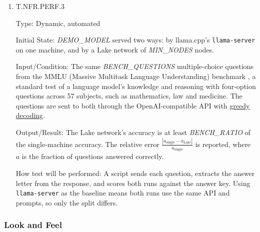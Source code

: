 \documentclass[12pt, titlepage]{article}
\providecommand{\glink}[2]{\hyperlink{gls:#1}{#2}}
\begin{document}
\begin{enumerate}
Input/Condition: For each $k$, the number of concurrent requests $c$ is
increased through $1, 2, 4, 8, \ldots$ while each request generates
\textit{GEN\_TOKENS} tokens.

Output/Result: For each $k$, the largest $c$, called $c_{\max}(k)$, at which
the mean per-request token throughput is within \textit{MAX\_DEGRADATION} of the
single-request throughput. The test passes if $c_{\max}(k) \ge$
\textit{MIN\_CONCURRENT} for every $k \ge 2$ and $c_{\max}(k) \ge k \cdot
c_{\max}(1)$. The results are also reported as a table and a graph of
$c_{\max}$ against $k$.

How test will be performed: A load-test script sends the requests through the
OpenAI-compatible API and records the tokens per second of each request. The
results are kept for the Performance Report.

\item{T.NFR.PERF.3\\}
\label{T.NFR.PERF.3}

Type: Dynamic, automated

Initial State: \textit{DEMO\_MODEL} served two ways: by llama.cpp's
\texttt{llama-server} on one machine, and by a Lake network of \textit{MIN\_NODES} nodes.

Input/Condition: The same \textit{BENCH\_QUESTIONS} multiple-choice questions
from the MMLU (Massive Multitask Language Understanding) benchmark
\citep{MMLU}, a standard test of a language model's knowledge and
reasoning with four-option questions across 57 subjects, such as mathematics,
law and medicine. The questions are sent to both through the OpenAI-compatible API with
\glink{greedy}{greedy decoding}.

Output/Result: The Lake network's accuracy is at least \textit{BENCH\_RATIO} of
the single-machine accuracy. The relative error
$\frac{|a_{\mathrm{single}} - a_{\mathrm{Lake}}|}{a_{\mathrm{single}}}$ is reported, where
$a$ is the fraction of questions answered correctly.

How test will be performed: A script sends each question, extracts the answer
letter from the response, and scores both runs against the answer key. Using
\texttt{llama-server} as the baseline means both runs use the same API and
prompts, so only the split differs.

\end{enumerate}

\subsubsection{Look and Feel}
\end{document}
